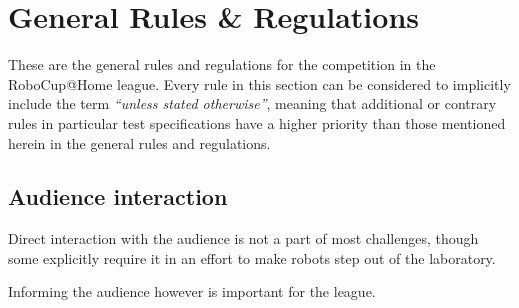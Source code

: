 \chapter{General Rules \& Regulations}
\label{chap:rules}

These are the general rules and regulations for the competition in the RoboCup@Home league.
Every rule in this section can be considered to implicitly include the
term \emph{\enquote{unless stated otherwise}}, meaning that additional or contrary rules in particular
test specifications have a higher priority than those mentioned herein in the general rules and regulations.



\section{Audience interaction}
Direct interaction with the audience is not a part of most challenges, though some explicitly require it in an effort to make robots step out of the laboratory.

Informing the audience however is important for the league.






% 
















